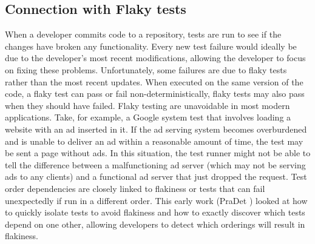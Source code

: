 \documentclass[conference]{IEEEtran}
\begin{document}
\subsection{Connection with Flaky tests}
When a developer commits code to a repository, tests are run to see if the changes have broken any functionality. Every new test failure would ideally be due to the developer's most recent modifications, allowing the developer to focus on fixing these problems. Unfortunately, some failures are due to flaky tests rather than the most recent updates. When executed on the same version of the code, a flaky test can pass or fail non-deterministically, flaky tests may also pass when they should have failed. Flaky testing are unavoidable in most modern applications. Take, for example, a Google system test that involves loading a website with an ad inserted in it. If the ad serving system becomes overburdened and is unable to deliver an ad within a reasonable amount of time, the test may be sent a page without ads. In this situation, the test runner might not be able to tell the difference between a malfunctioning ad server (which may not be serving ads to any clients) and a functional ad server that just dropped the request.
Test order dependencies are closely linked to flakiness or tests that can fail unexpectedly if run in a different order. This early work (PraDet \cite{b8}) looked at how to quickly isolate tests to avoid flakiness and how to exactly discover which tests depend on one other, allowing developers to detect which orderings will result in flakiness.
\end{document}

